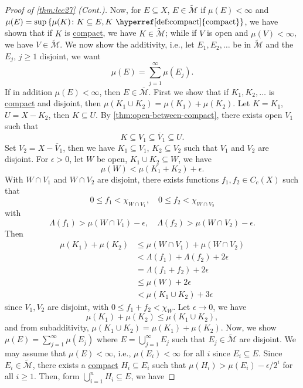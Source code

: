\begin{proof}[Proof of \autoref{thm:lec27} (Cont.)]
	Now, for \(E \subseteq X\), \(E \in \widetilde{\mathcal{M}} \) if \(\mu (E) < \infty \) and \(\mu (E) = \sup \left\{ \mu (K) \colon K \subseteq E, K \text{ \hyperref[def:compact]{compact}}  \right\} \), we have shown that if \(K\) is \hyperref[def:compact]{compact}, we have \(K \in \widetilde{\mathcal{M}} \); while if \(V\) is open and \(\mu (V) < \infty \), we have \(V\in \widetilde{\mathcal{M}} \). We now show the additivity, i.e., let \(E_1, E_2, \dots \) be in \( \widetilde{\mathcal{M}} \) and the \(E_j\), \(j\geq 1\) disjoint, we want
	\[
		\mu (E) = \sum_{j=1}^{\infty} \mu (E_j).
	\]
	If in addition \(\mu (E) < \infty \), then \(E \in \overline{\mathcal{M}}\). First we show that if \(K_1, K_2, \dots  \) is \hyperref[def:compact]{compact} and disjoint, then \(\mu (K_1 \cup K_2) = \mu (K_1) + \mu (K_2)\). Let \(K = K_1\), \(U = X - K_2\), then \(K \subseteq U\). By \autoref{thm:open-between-compact}, there exists open \(V_1\) such that
	\[
		K \subseteq V_1 \subseteq \overline{V} _1 \subseteq U.
	\]
	Set \(V_2 = X - \overline{V} _1\), then we have \(K_1 \subseteq V_1\), \(K_2 \subseteq V_2\) such that \(V_1\) and \(V_2\) are disjoint. For \(\epsilon > 0\), let \(W\) be open, \(K_1 \cup K_2 \subseteq W\), we have
	\[
		\mu (W) < \mu (K_1 + K_2) + \epsilon.
	\]
	With \(W \cap V_1\) and \(W \cap V_2\) are disjoint, there exists functions \(f_1, f_2 \in C_c(X)\) such that
	\[
		0 \leq f_1 < \chi _{W \cap V_1}, \quad 0 \leq f_2 < \chi _{W \cap V_2}
	\]
	with
	\[
		\Lambda (f_1) > \mu (W \cap V_1) - \epsilon ,\quad \Lambda (f_2) > \mu (W \cap V_2) - \epsilon.
	\]
	Then
	\[
		\begin{split}
			\mu (K_1) + \mu (K_2)
			 & \leq \mu (W \cap V_1) + \mu (W \cap V_2)    \\
			 & < \Lambda (f_1) + \Lambda (f_2) + 2\epsilon \\
			 & = \Lambda (f_1 + f_2) + 2\epsilon           \\
			 & \leq \mu (W) + 2\epsilon                    \\
			 & < \mu (K_1 \cup K_2) + 3\epsilon
		\end{split}
	\]
	since \(V_1, V_2\) are disjoint, with \(0 \leq f_1 + f_2 < \chi _W\). Let \(\epsilon \to 0\), we have
	\[
		\mu (K_1) + \mu (K_2) \leq \mu (K_1 \cup K_2),
	\]
	and from subadditivity, \(\mu (K_1 \cup K_2) = \mu (K_1) + \mu (K_2)\). Now, we show \(\mu (E) = \sum_{j=1}^{\infty} \mu (E_j)\) where \(E = \bigcup_{j=1}^{\infty} E_j\) such that \(E_j\in \widetilde{\mathcal{M}} \) are disjoint. We may assume that \(\mu (E) < \infty \), i.e., \(\mu (E_i) < \infty \) for all \(i\) since \(E_i \subseteq E\). Since \(E_i\in \widetilde{\mathcal{M}} \), there exists a \hyperref[def:compact]{compact} \(H_i \subseteq E_i\) such that \(\mu (H_i) > \mu (E_i) - \epsilon / 2^i\) for all \(i \geq 1\). Then, form \(\bigcup_{i=1}^{n} H_i \subseteq E\), we have

\end{proof}
